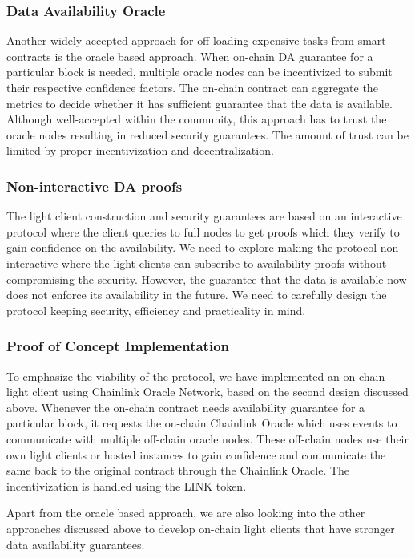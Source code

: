 \documentclass[sigconf, screen=true, nonacm]{acmart}
\begin{document}
        \subsubsection{Data Availability Oracle}
            Another widely accepted approach for off-loading expensive tasks from smart contracts is the oracle based approach. When on-chain DA guarantee for a particular block is needed, multiple oracle nodes can be incentivized to submit their respective confidence factors. The on-chain contract can aggregate the metrics to decide whether it has sufficient guarantee that the data is available. Although well-accepted within the community, this approach has to trust the oracle nodes resulting in reduced security guarantees. The amount of trust can be limited by proper incentivization and decentralization. 

        \subsubsection{Non-interactive DA proofs}
            The light client construction and security guarantees are based on an interactive protocol where the client queries to full nodes to get proofs which they verify to gain confidence on the availability. We need to explore making the protocol non-interactive where the light clients can subscribe to availability proofs without compromising the security. However, the guarantee that the data is available now does not enforce its availability in the future. We need to carefully design the protocol keeping security, efficiency and practicality in mind. 
        
        \subsubsection{Proof of Concept Implementation}
            To emphasize the viability of the protocol, we have implemented an on-chain light client using Chainlink Oracle Network, based on the second design discussed above. Whenever the on-chain contract needs availability guarantee for a particular block, it requests the on-chain Chainlink Oracle which uses events to communicate with multiple off-chain oracle nodes. These off-chain nodes use their own light clients or hosted instances to gain confidence and communicate the same back to the original contract through the Chainlink Oracle. The incentivization is handled using the LINK token. 

            Apart from the oracle based approach, we are also looking into the other approaches discussed above to develop on-chain light clients that have stronger data availability guarantees. 
\end{document}
